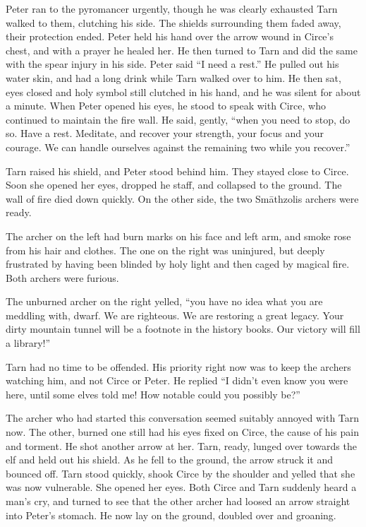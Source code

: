 Peter ran to the pyromancer urgently, though he was clearly exhausted  Tarn walked to them, clutching his side.  The shields surrounding them faded away, their protection ended.  Peter held his hand over the arrow wound in Circe's chest, and with a prayer he healed her.  He then turned to Tarn and did the same with the spear injury in his side.  Peter said ``I need a rest.''  He pulled out his water skin, and had a long drink while Tarn walked over to him.  He then sat, eyes closed and holy symbol still clutched in his hand, and he was silent for about a minute.  When Peter opened his eyes, he stood to speak with Circe, who continued to maintain the fire wall.  He said, gently, ``when you need to stop, do so.  Have a rest.  Meditate, and recover your strength, your focus and your courage.  We can handle ourselves against the remaining two while you recover.''

Tarn raised his shield, and Peter stood behind him.  They stayed close to Circe.  Soon she opened her eyes, dropped he staff, and collapsed to the ground.  The wall of fire died down quickly.  On the other side, the two Sm\=athzolis archers were ready.

The archer on the left had burn marks on his face and left arm, and smoke rose from his hair and clothes.  The one on the right was uninjured, but deeply frustrated by having been blinded by holy light and then caged by magical fire.  Both archers were furious.

The unburned archer on the right yelled, ``you have no idea what you are meddling with, dwarf.  We are righteous.  We are restoring a great legacy.  Your dirty mountain tunnel will be a footnote in the history books.  Our victory will fill a library!''

Tarn had no time to be offended.  His priority right now was to keep the archers watching him, and not Circe or Peter.  He replied ``I didn't even know you were here, until some elves told me!  How notable could you possibly be?''

The archer who had started this conversation seemed suitably annoyed with Tarn now.  The other, burned one still had his eyes fixed on Circe, the cause of his pain and torment.  He shot another arrow at her.  Tarn, ready, lunged over towards the elf and held out his shield.  As he fell to the ground, the arrow struck it and bounced off.  Tarn stood quickly, shook Circe by the shoulder and yelled that she was now vulnerable.  She opened her eyes.  Both Circe and Tarn suddenly heard a man's cry, and turned to see that the other archer had loosed an arrow straight into Peter's stomach.  He now lay on the ground, doubled over and groaning.

